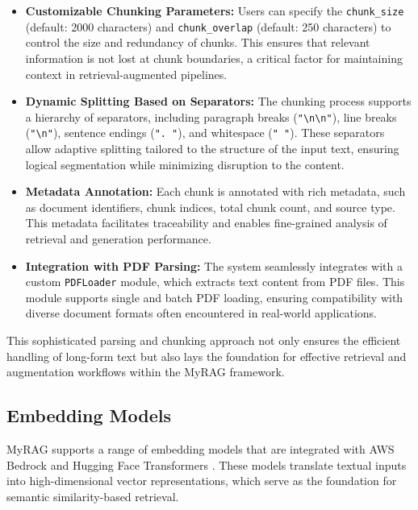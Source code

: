 \documentclass{scrartcl}
\begin{document}
\begin{itemize}
    \item \textbf{Customizable Chunking Parameters:} Users can specify the \texttt{chunk\_size} (default: 2000 characters) and \texttt{chunk\_overlap} (default: 250 characters) to control the size and redundancy of chunks. This ensures that relevant information is not lost at chunk boundaries, a critical factor for maintaining context in retrieval-augmented pipelines.

    \item \textbf{Dynamic Splitting Based on Separators:} The chunking process supports a hierarchy of separators, including paragraph breaks (\texttt{"\textbackslash n\textbackslash n"}), line breaks (\texttt{"\textbackslash n"}), sentence endings (\texttt{". "}), and whitespace (\texttt{" "}). These separators allow adaptive splitting tailored to the structure of the input text, ensuring logical segmentation while minimizing disruption to the content.

    \item \textbf{Metadata Annotation:} Each chunk is annotated with rich metadata, such as document identifiers, chunk indices, total chunk count, and source type. This metadata facilitates traceability and enables fine-grained analysis of retrieval and generation performance.


    \item \textbf{Integration with PDF Parsing:} The system seamlessly integrates with a custom \texttt{PDFLoader} module, which extracts text content from PDF files. This module supports single and batch PDF loading, ensuring compatibility with diverse document formats often encountered in real-world applications.

\end{itemize}

This sophisticated parsing and chunking approach not only ensures the efficient handling of long-form text but also lays the foundation for effective retrieval and augmentation workflows within the MyRAG framework.
\subsection{Embedding Models}
MyRAG supports a range of embedding models that are integrated 
 with AWS Bedrock and Hugging Face Transformers \cite{huggingfacedocs, AmazonBedrockAPI2024}. These models translate textual inputs into high-dimensional vector representations, which serve as the foundation for semantic similarity-based retrieval.
\end{document}
